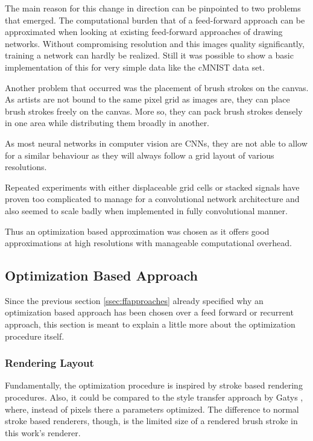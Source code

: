 The main reason for this change in direction can be pinpointed to two problems that
emerged.
The computational burden that of a feed-forward approach can be approximated when
looking at existing feed-forward approaches of drawing networks.
Without compromising resolution and this images quality significantly, training
a network can hardly be realized.
Still it was possible to show a basic implementation of this for very simple data
like the cMNIST data set.  

Another problem that occurred was the placement of brush strokes on the canvas.
As artists are not bound to the same pixel grid as images are, they can place brush
strokes freely on the canvas.
More so, they can pack brush strokes densely in one area while distributing them
broadly in another.

As most neural networks in computer vision are CNNs, they are not able to allow for
a similar behaviour as they will always follow a grid layout of various resolutions.

Repeated experiments with either displaceable grid cells or stacked signals have proven
too complicated to manage for a convolutional network architecture and also seemed
to scale badly when implemented in fully convolutional manner.

Thus an optimization based approximation was chosen as it offers good approximations
at high resolutions with manageable computational overhead.

\subsection{Optimization Based Approach}
Since the previous section \ref{ssec:ffapproaches} already specified why an optimization
based approach has been chosen over a feed forward or recurrent approach, this section
is meant to explain a little more about the optimization procedure itself.


\subsubsection{Rendering Layout}
Fundamentally, the optimization procedure is inspired by stroke based rendering procedures.
Also, it could be compared to the style transfer approach by Gatys \etal \cite{gatys}, where, 
instead of pixels there a parameters optimized.
The difference to normal stroke based renderers, though, is the limited size of a
rendered brush stroke in this work's renderer.

